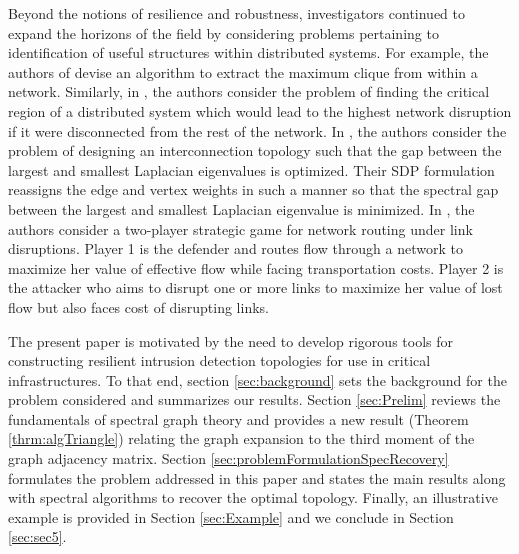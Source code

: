 \documentclass[reqno,8pt]{amsart}
\theoremstyle{definition}
\theoremstyle{remark}
\numberwithin{equation}{section}
\begin{document}
Beyond the notions of resilience and robustness, investigators continued to expand the horizons of the field by considering problems pertaining to identification of useful structures within distributed systems. For example, the authors of \cite{Akoglu2015} devise an algorithm to extract the maximum clique from within a network. 
Similarly, in \cite{Van2013}, the authors consider the problem of finding the critical region of a distributed system which would lead to the highest network disruption if it were disconnected from the rest of the network. In \cite{Shafi2010}, the authors consider the problem of designing an interconnection topology such that the gap between the largest and smallest Laplacian eigenvalues is optimized. Their SDP formulation reassigns the edge and vertex weights in such a manner so that the spectral gap between the largest and smallest Laplacian eigenvalue is minimized. In \cite{dahan_security_2016}, the authors consider a two-player strategic game for network routing under link disruptions. Player 1 is the defender and routes flow through a network to maximize her value of effective flow while facing transportation costs. Player 2 is the attacker who aims to disrupt one or more links to maximize her value of lost flow but also faces cost of disrupting links.

\medskip

The present paper is motivated by the need to develop rigorous tools for constructing resilient intrusion detection topologies for use in critical infrastructures. To that end, section \ref{sec:background} sets the background for the problem considered and summarizes our results. Section \ref{sec:Prelim} reviews the fundamentals of spectral graph theory and provides a new result (Theorem \ref{thrm:algTriangle}) relating the graph expansion to the third moment of the graph adjacency matrix. %
Section \ref{sec:problemFormulationSpecRecovery} formulates the problem addressed in this paper and states the main results along with spectral algorithms to recover the optimal topology. Finally, an illustrative example is provided in Section \ref{sec:Example} and we conclude in Section \ref{sec:sec5}.   
\end{document}
